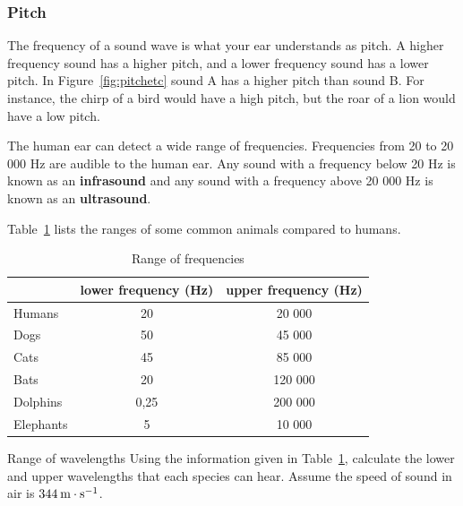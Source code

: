             \subsubsection{Pitch}
            \nopagebreak
            \label{m38799*id183534}The frequency of a sound wave is what your ear understands as pitch. A higher frequency sound has a higher pitch, and a lower frequency sound has a lower pitch. In Figure~\ref{fig:pitchetc} sound A has a higher pitch than sound B. For instance, the chirp of a bird would have a high pitch, but the roar of a lion would have a low pitch.\par 
        \label{m38799*id183546}The human ear can detect a wide range of frequencies. Frequencies from 20 to 20 000 Hz are audible to the human ear. Any sound with a frequency below 20 Hz is known as an \textbf{infrasound} and any sound with a frequency above 20 000 Hz is known as an \textbf{ultrasound}. \par 
 Table~\ref{p:wsl:s11:rangeoff} lists the ranges of some common animals compared to humans.

\begin{table}[H]
\begin{center}
\caption{Range of frequencies}
\label{p:wsl:s11:rangeoff}
\begin{tabular}{|l|c|c|}\hline
&lower frequency (Hz) & upper frequency (Hz)\\\hline\hline
Humans & 20 & 20 000\\\hline
Dogs & 50 & 45 000\\\hline
Cats & 45 & 85 000\\\hline
Bats & 20 & 120 000\\\hline
Dolphins & 0,25 & 200 000\\\hline
Elephants & 5 & 10 000\\\hline
\hline
\end{tabular}
\end{center}
\end{table}
    \par
\begin{activity}{Range of wavelengths }
            \nopagebreak
        \label{m38799*id183776}Using the information given in Table~\ref{p:wsl:s11:rangeoff}, calculate the lower and upper wavelengths that each species can hear. Assume the speed of sound in air is $344\phantom{\rule{2pt}{0ex}}\text{m}\ensuremath{\cdot}\text{s}{}^{-1}$.
\end{activity}
 
      \label{m38799*uid4}
